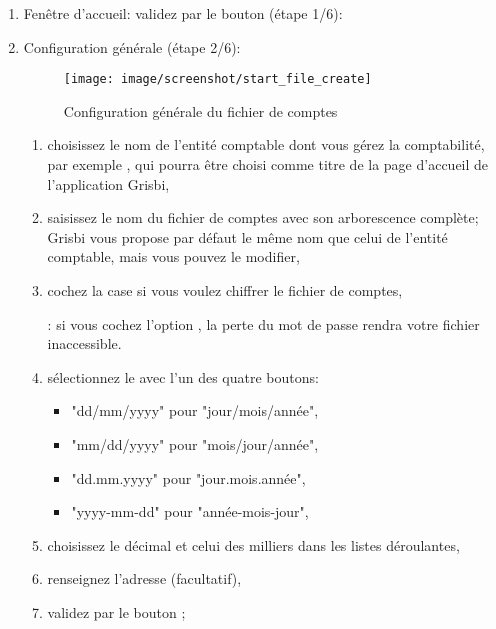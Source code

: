 \begin{enumerate}
	\item Fenêtre d'accueil: validez par le bouton  (étape 1/6):
	\item Configuration
 générale (étape 2/6):

		\begin{figure}[htbp]
		\begin{center}
		\texttt{[image: image/screenshot/start\_file\_create]}
		\end{center}
		\caption{Configuration générale du fichier de comptes}
		\label{start-file-create}
		\end{figure}
		
		\begin{enumerate} 
		 	\item choisissez le nom de l'entité comptable dont vous gérez la comptabilité, par exemple , qui pourra être choisi comme titre de la page d'accueil de l'application Grisbi,
			\item saisissez le nom du fichier de comptes avec son arborescence complète; Grisbi vous propose par défaut le même nom que celui de l'entité comptable, mais vous pouvez le modifier,
			\item cochez la case  si vous voulez \gls{chiffrer} le fichier de comptes,
			
			\textcolor{red}{}: si vous cochez l'option , la perte du mot de passe rendra votre fichier inaccessible.
			
			\item sélectionnez le  avec l'un des quatre boutons:
				\begin{itemize}	
				\item[\textopenbullet] "dd/mm/yyyy" pour "jour/mois/année",
				\item[\textopenbullet] "mm/dd/yyyy" pour "mois/jour/année",
				\item[\textopenbullet] "dd.mm.yyyy" pour "jour.mois.année",
				\item[\textopenbullet] "yyyy-mm-dd" pour "année-mois-jour",
				\end{itemize}
			\item choisissez le  décimal et celui des milliers dans les listes déroulantes,
			 \item renseignez l'adresse (facultatif),
			 \item  validez par le bouton ;
		\end{enumerate}
		

\end{enumerate}
